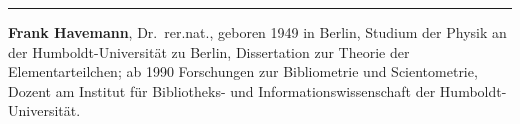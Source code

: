 \begin{center}\rule{0.5\linewidth}{\linethickness}\end{center}

\textbf{Frank Havemann}, Dr.~rer.nat., geboren 1949 in Berlin, Studium
der Physik an der Humboldt-Universität zu Berlin, Dissertation zur
Theorie der Elementarteilchen; ab 1990 Forschungen zur Bibliometrie und
Scientometrie, Dozent am Institut für Bibliotheks- und
Informationswissenschaft der Humboldt-Universität.

